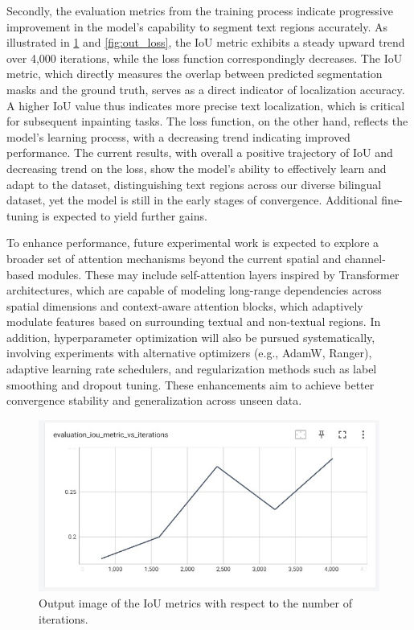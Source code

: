 \documentclass[10pt,twocolumn,letterpaper]{article}
\begin{document}
Secondly, the evaluation metrics from the training process indicate progressive improvement in the model's capability to segment text regions accurately. 
As illustrated  in \cref{fig:out_iou} and \cref{fig:out_loss}, the IoU metric exhibits a steady upward trend over 4,000 iterations, while the loss function correspondingly decreases. 
The IoU metric, which directly measures the overlap between predicted segmentation masks and the ground truth, serves as a direct indicator of localization accuracy. A higher IoU value 
thus indicates more precise text localization, which is critical for subsequent inpainting tasks. The loss function, on the other hand, reflects the model's learning process, 
with a decreasing trend indicating improved performance.
The current results, with overall a positive trajectory of IoU and decreasing trend on the loss, show the model's ability to effectively learn and adapt to the dataset, distinguishing 
text regions across our diverse bilingual dataset, yet the model is still in the early stages of convergence. Additional fine-tuning is expected to yield further gains.

To enhance performance, future experimental work is expected to explore a broader set of attention mechanisms beyond the current spatial and channel-based modules. 
These may include self-attention layers inspired by Transformer architectures, which are capable of modeling long-range dependencies across spatial dimensions and context-aware attention blocks, 
which adaptively modulate features based on surrounding textual and non-textual regions. In addition, hyperparameter optimization will also be pursued systematically, 
involving experiments with alternative optimizers (e.g., AdamW, Ranger), adaptive learning rate schedulers, and regularization methods such as label smoothing and dropout tuning. 
These enhancements aim to achieve better convergence stability and generalization across unseen data.

\begin{figure}[t]
    \centering
    \includegraphics[width=\linewidth]{figures/milestone/out_iou.jpg}
    \caption{Output image of the IoU metrics with respect to the number of iterations. }
    \label{fig:out_iou}
\end{figure}
\end{document}

